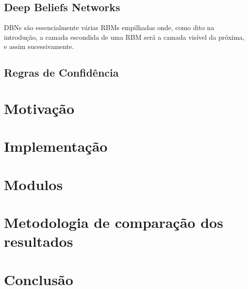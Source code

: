 \documentclass[a4paper, 12pt]{article}
\begin{document}
    \subsection{Deep Beliefs Networks}
    DBNs são essencialmente várias RBMs empilhadas onde, como dito na introdução, a camada escondida de uma RBM será a camada visível da próxima, e assim sucessivamente.
    
    \subsection{Regras de Confidência}
    
    \section{Motivação}
    \section{Implementação}
    \section{Modulos}
    \section{Metodologia de comparação dos resultados}
    \section{Conclusão}
    
    
    
\end{document}
